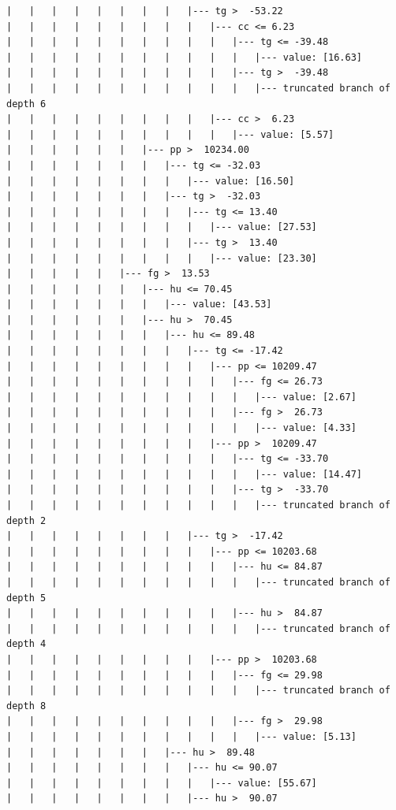 \documentclass[UTF8, a4paper]{ctexart}
\begin{document}
\begin{lstlisting}
|   |   |   |   |   |   |   |   |--- tg >  -53.22
|   |   |   |   |   |   |   |   |   |--- cc <= 6.23
|   |   |   |   |   |   |   |   |   |   |--- tg <= -39.48
|   |   |   |   |   |   |   |   |   |   |   |--- value: [16.63]
|   |   |   |   |   |   |   |   |   |   |--- tg >  -39.48
|   |   |   |   |   |   |   |   |   |   |   |--- truncated branch of depth 6
|   |   |   |   |   |   |   |   |   |--- cc >  6.23
|   |   |   |   |   |   |   |   |   |   |--- value: [5.57]
|   |   |   |   |   |   |--- pp >  10234.00
|   |   |   |   |   |   |   |--- tg <= -32.03
|   |   |   |   |   |   |   |   |--- value: [16.50]
|   |   |   |   |   |   |   |--- tg >  -32.03
|   |   |   |   |   |   |   |   |--- tg <= 13.40
|   |   |   |   |   |   |   |   |   |--- value: [27.53]
|   |   |   |   |   |   |   |   |--- tg >  13.40
|   |   |   |   |   |   |   |   |   |--- value: [23.30]
|   |   |   |   |   |--- fg >  13.53
|   |   |   |   |   |   |--- hu <= 70.45
|   |   |   |   |   |   |   |--- value: [43.53]
|   |   |   |   |   |   |--- hu >  70.45
|   |   |   |   |   |   |   |--- hu <= 89.48
|   |   |   |   |   |   |   |   |--- tg <= -17.42
|   |   |   |   |   |   |   |   |   |--- pp <= 10209.47
|   |   |   |   |   |   |   |   |   |   |--- fg <= 26.73
|   |   |   |   |   |   |   |   |   |   |   |--- value: [2.67]
|   |   |   |   |   |   |   |   |   |   |--- fg >  26.73
|   |   |   |   |   |   |   |   |   |   |   |--- value: [4.33]
|   |   |   |   |   |   |   |   |   |--- pp >  10209.47
|   |   |   |   |   |   |   |   |   |   |--- tg <= -33.70
|   |   |   |   |   |   |   |   |   |   |   |--- value: [14.47]
|   |   |   |   |   |   |   |   |   |   |--- tg >  -33.70
|   |   |   |   |   |   |   |   |   |   |   |--- truncated branch of depth 2
|   |   |   |   |   |   |   |   |--- tg >  -17.42
|   |   |   |   |   |   |   |   |   |--- pp <= 10203.68
|   |   |   |   |   |   |   |   |   |   |--- hu <= 84.87
|   |   |   |   |   |   |   |   |   |   |   |--- truncated branch of depth 5
|   |   |   |   |   |   |   |   |   |   |--- hu >  84.87
|   |   |   |   |   |   |   |   |   |   |   |--- truncated branch of depth 4
|   |   |   |   |   |   |   |   |   |--- pp >  10203.68
|   |   |   |   |   |   |   |   |   |   |--- fg <= 29.98
|   |   |   |   |   |   |   |   |   |   |   |--- truncated branch of depth 8
|   |   |   |   |   |   |   |   |   |   |--- fg >  29.98
|   |   |   |   |   |   |   |   |   |   |   |--- value: [5.13]
|   |   |   |   |   |   |   |--- hu >  89.48
|   |   |   |   |   |   |   |   |--- hu <= 90.07
|   |   |   |   |   |   |   |   |   |--- value: [55.67]
|   |   |   |   |   |   |   |   |--- hu >  90.07

\end{lstlisting}
\end{document}
